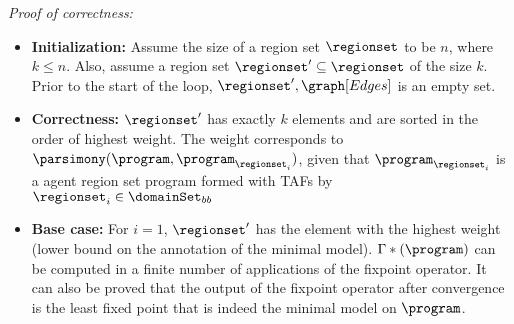 \noindent\textit{Proof of correctness:}
\begin{itemize}
    \item \textbf{Initialization:} Assume the size of a region set $\regionset$ to be $n$, where $k \leq n$. Also, assume a region set $\regionset' \subseteq \regionset$ of the size $k$. Prior to the start of the loop, $\regionset', \graph[Edges]$ is an empty set.
    \item \textbf{Correctness:} $\regionset'$ has exactly $k$ elements and are sorted in the order of highest weight. The weight corresponds to $\parsimony(\program,\program_{\regionset_i})$, given that $\program_{\regionset_i}$ is a agent region set program formed with TAFs by $\regionset_i \in \domainSet_{bb}$
    \item \textbf{Base case:} For $i=1$, $\regionset'$ has the element with the highest weight (lower bound on the annotation of the minimal model). $\Gamma*(\program)$ can be computed in a finite number of applications of the fixpoint operator. It can also be proved that the output of the fixpoint operator after convergence is the least fixed point that is indeed the minimal model on $\program$.

\end{itemize}






